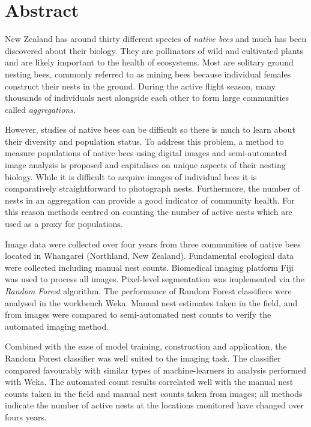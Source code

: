 \begingroup
\let\clearpage\relax
\let\cleardoublepage\relax
\let\cleardoublepage\relax

\chapter*{Abstract}

New Zealand has around thirty different species of \emph{native bees} and much has been discovered about their biology. They are pollinators of wild and cultivated plants and are likely important to the health of ecosystems. Most are solitary ground nesting bees, commonly referred to as mining bees because individual females construct their nests in the ground. During the active flight season, many thousands of individuals nest alongside each other to form large communities called \emph{aggregations}.

However, studies of native bees can be difficult so there is much to learn about their diversity and population status. To address this problem, a method to measure populations of native bees using digital images and semi-automated image analysis is proposed and capitalises on unique aspects of their nesting biology. While it is difficult to acquire images of individual bees it is  comparatively straightforward to photograph nests. Furthermore, the number of nests in an aggregation can provide a good indicator of community health. For this reason methods centred on counting the number of active nests which are used as a proxy for populations.
 
Image data were collected over four years from three communities of native bees located in Whangarei (Northland, New Zealand). Fundamental ecological data were collected including  manual nest counts. Biomedical imaging platform Fiji was used to process all images. Pixel-level segmentation was implemented via the \emph{Random Forest} algorithm. The  performance of Random Forest classifiers were analysed in the workbench Weka. Manual nest estimates taken in the field, and from images were compared to semi-automated nest counts to verify the automated imaging method. 

Combined with the ease of model training, construction and application, the Random Forest classifier was well suited to the imaging task. The classifier compared favourably with similar types of machine-learners in analysis performed with Weka. The automated count results correlated well with the manual nest counts taken in the field and manual nest counts taken from images; all methods indicate the number of active nests at the locations monitored have changed over fours years.
 
